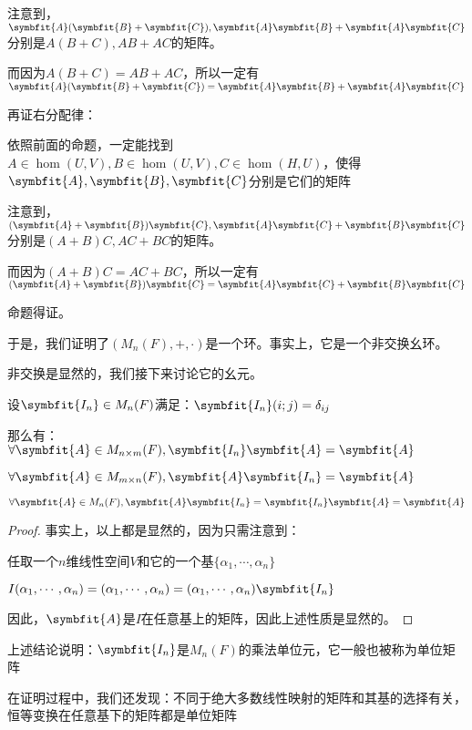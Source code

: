 \documentclass[12pt, a4paper, oneside, UTF8]{ctexbook}
\begin{document}
\begin{para}{0}
\begin{proposition}
						注意到，$\symbfit{A}(\symbfit{B}+\symbfit{C}),\symbfit{A}\symbfit{B}+\symbfit{A}\symbfit{C}$分别是$A(B+C),AB+AC$的矩阵。
						
						而因为$A(B+C)=AB+AC$，所以一定有$\symbfit{A}(\symbfit{B}+\symbfit{C})=\symbfit{A}\symbfit{B}+\symbfit{A}\symbfit{C}$

						再证右分配律：

						依照前面的命题，一定能找到$A \in \hom(U,V),B \in \hom(U,V),C \in \hom(H,U)$，使得$\symbfit{A},\symbfit{B},\symbfit{C}$分别是它们的矩阵

						注意到，$(\symbfit{A}+\symbfit{B})\symbfit{C},\symbfit{A}\symbfit{C}+\symbfit{B}\symbfit{C}$分别是$(A+B)C,AC+BC$的矩阵。
						
						而因为$(A+B)C=AC+BC$，所以一定有$(\symbfit{A}+\symbfit{B})\symbfit{C}=\symbfit{A}\symbfit{C}+\symbfit{B}\symbfit{C}$
						
						命题得证。
					\end{proposition}
					于是，我们证明了$(M_n(F),+,\cdot)$是一个环。事实上，它是一个非交换幺环。

					非交换是显然的，我们接下来讨论它的幺元。
					\begin{proposition}
						设$\symbfit{I_n} \in M_n(F)$满足：$\symbfit{I_n}(i;j)=\delta_{ij}$

						那么有：$\forall \symbfit{A} \in M_{n \times m}(F),\symbfit{I_n}\symbfit{A}=\symbfit{A}$

						$\forall \symbfit{A} \in M_{m \times n}(F),\symbfit{A}\symbfit{I_n}=\symbfit{A}$

						$\forall \symbfit{A} \in M_{n}(F),\symbfit{A}\symbfit{I_n}=\symbfit{I_n}\symbfit{A}=\symbfit{A}$
					\end{proposition}
					\begin{proof}
						事实上，以上都是显然的，因为只需注意到：

						任取一个$n$维线性空间$V$和它的一个基$\{\alpha_1,\cdots,\alpha_n\}$

						$I(\alpha_1,\cdots,\alpha_n)=(\alpha_1,\cdots,\alpha_n)=(\alpha_1,\cdots,\alpha_n)\symbfit{I_n}$

						因此，$\symbfit{A}$是$I$在任意基上的矩阵，因此上述性质是显然的。
					\end{proof}
					上述结论说明：$\symbfit{I_n}$是$M_n(F)$的乘法单位元，它一般也被称为单位矩阵

					在证明过程中，我们还发现：不同于绝大多数线性映射的矩阵和其基的选择有关，恒等变换在任意基下的矩阵都是单位矩阵


\end{para}
\end{document}

